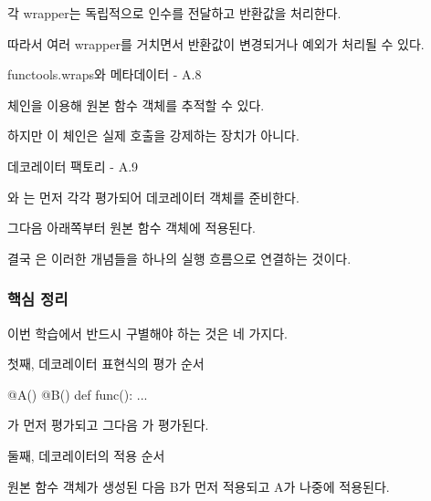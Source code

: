 각 wrapper는 독립적으로 인수를 전달하고 반환값을 처리한다.

따라서 여러 wrapper를 거치면서 반환값이 변경되거나 예외가 처리될 수 있다.

\begin{dhknote}
\begin{dhksmry}[centered]
functools.wraps와 메타데이터 - A.8
\end{dhksmry}
\end{dhknote}

 체인을 이용해 원본 함수 객체를 추적할 수 있다.

하지만 이 체인은 실제 호출을 강제하는 장치가 아니다.

\begin{dhknote}
\begin{dhksmry}[centered]
데코레이터 팩토리 - A.9
\end{dhksmry}
\end{dhknote}

와 는 먼저 각각 평가되어 데코레이터 객체를 준비한다.

그다음 아래쪽부터 원본 함수 객체에 적용된다.

결국 은 이러한 개념들을 하나의 실행 흐름으로 연결하는 것이다.

\subsubsection{핵심 정리}

이번 학습에서 반드시 구별해야 하는 것은 네 가지다.

\begin{dhknote}
\begin{dhksmry}[centered]
첫째, 데코레이터 표현식의 평가 순서
\end{dhksmry}
\end{dhknote}

\begin{dhkcode}
@A()
@B()
def func():
    ...
\end{dhkcode}

가 먼저 평가되고 그다음 가 평가된다.

\begin{dhknote}
\begin{dhksmry}[centered]
둘째, 데코레이터의 적용 순서
\end{dhksmry}
\end{dhknote}

원본 함수 객체가 생성된 다음 B가 먼저 적용되고 A가 나중에 적용된다.

